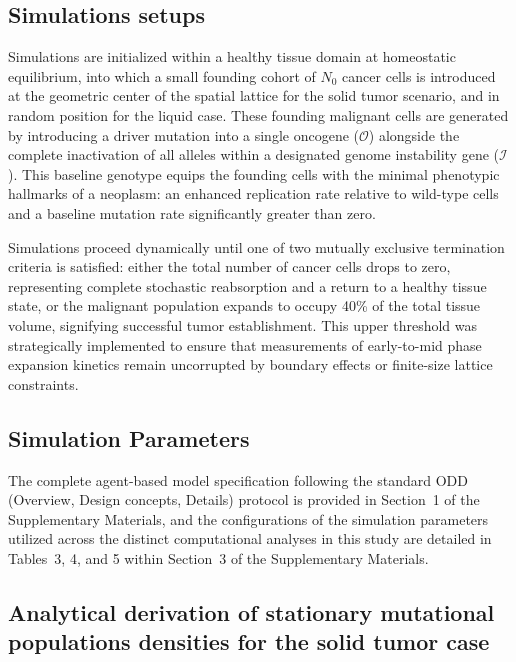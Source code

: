 \documentclass[10pt, aps, rmp,  twocolumn, superscriptaddress, floatfix, showkeys]{revtex4-2}
\begin{document}
\subsection*{Simulations setups}
Simulations are initialized within a healthy tissue domain at homeostatic equilibrium, into which a small founding cohort of $N_0$ cancer cells is introduced at the geometric center of the spatial lattice for the solid tumor scenario, and in random position for the liquid case. These founding malignant cells are generated by introducing a driver mutation into a single oncogene ($\mathcal{O}$) alongside the complete inactivation of all alleles within a designated genome instability gene ($\mathcal{I}$). This baseline genotype equips the founding cells with the minimal phenotypic hallmarks of a neoplasm: an enhanced replication rate relative to wild-type cells and a baseline mutation rate significantly greater than zero.

Simulations proceed dynamically until one of two mutually exclusive termination criteria is satisfied: either the total number of cancer cells drops to zero, representing complete stochastic reabsorption and a return to a healthy tissue state, or the malignant population expands to occupy 40\% of the total tissue volume, signifying successful tumor establishment. This upper threshold was strategically implemented to ensure that measurements of early-to-mid phase expansion kinetics remain uncorrupted by boundary effects or finite-size lattice constraints.

\subsection*{Simulation Parameters}

The complete agent-based model specification following the standard ODD (Overview, Design concepts, Details) protocol is provided in Section~1 of the Supplementary Materials, and the configurations of the simulation parameters utilized across the distinct computational analyses in this study are detailed in Tables~3, 4, and 5 within Section~3 of the Supplementary Materials.

\subsection*{Analytical derivation of stationary mutational populations densities for the solid tumor case}
\end{document}
